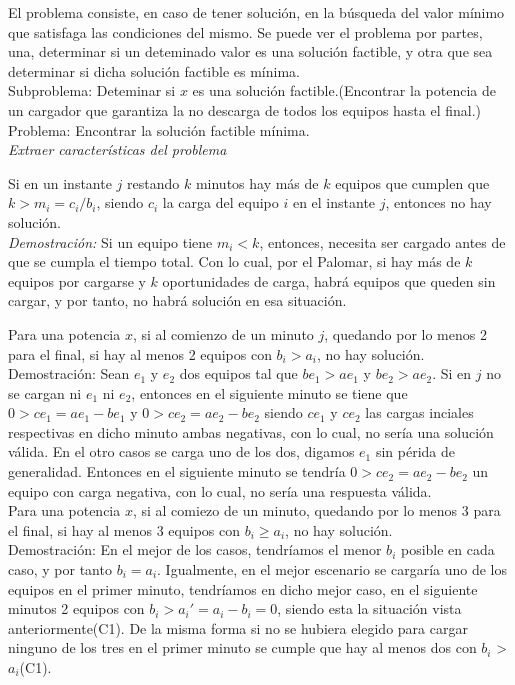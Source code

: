 \documentclass{article}
\begin{document}
El problema consiste, en caso de tener soluci\'on,  en la b\'usqueda del valor m\'inimo que satisfaga las condiciones del mismo. Se puede ver el problema por partes, una, determinar si un deteminado valor es una soluci\'on factible, y otra que sea determinar si dicha soluci\'on factible es m\'inima.\\

Subproblema: Deteminar si $x$ es una soluci\'on factible.(Encontrar la potencia de un cargador que garantiza la no descarga de todos los equipos hasta el final.)\\

Problema: Encontrar la soluci\'on factible m\'inima.\\

\textit{Extraer caracter\'isticas del problema}

 Si en un instante $j$ restando $k$ minutos hay m\'as de $k$ equipos que cumplen que $k>m_i=c_i/b_i$, siendo $c_i$ la carga del equipo $i$ en el instante $j$, entonces no hay soluci\'on.\\
\textit{Demostraci\'on:} Si un equipo tiene $m_i< k$, entonces, necesita ser cargado antes de que se cumpla el tiempo total. Con lo cual, por el Palomar, si hay m\'as de $k$ equipos por cargarse y $k$ oportunidades de carga, habr\'a equipos que queden sin cargar, y por tanto, no habr\'a soluci\'on en esa situaci\'on.

 Para una potencia $x$, si al comienzo de un minuto $j$, quedando por lo menos 2 para el final, si hay al menos 2 equipos con $b_i>a_i$, no hay soluci\'on.\\
Demostraci\'on: Sean $e_1$ y $e_2$ dos equipos tal que $be_1>ae_1$ y $be_2 > ae_2$.  Si en $j$ no se cargan ni $e_1$ ni $e_2$, entonces en el siguiente minuto se tiene que $0>ce_1=ae_1-be_1$ y $0>ce_2=ae_2-be_2$ siendo $ce_1$ y $ce_2$ las cargas inciales respectivas en dicho minuto ambas negativas, con lo cual, no ser\'ia una soluci\'on v\'alida. En el otro casos se carga uno de los dos, digamos $e_1$ sin p\'erida de generalidad. Entonces en el siguiente minuto se tendr\'ia $0>ce_2=ae_2-be_2$ un equipo con carga negativa, con lo cual, no ser\'ia una respuesta v\'alida. \\

 Para una potencia $x$, si al comiezo de un minuto, quedando por lo menos 3 para  el final, si hay al menos 3 equipos con $b_i\geq a_i$, no hay soluci\'on.\\
Demostraci\'on: En el mejor de los casos, tendr\'iamos el menor $b_i$ posible en cada caso, y por tanto $b_i=a_i$. Igualmente, en el mejor escenario se cargar\'ia uno de los equipos en el primer minuto, tendr\'iamos en dicho mejor caso, en el siguiente minutos 2 equipos con $b_i>a_i'=a_i-b_i=0$, siendo esta la situaci\'on vista anteriormente(C1). De la misma forma si no se hubiera elegido para cargar ninguno de los tres en el primer minuto se cumple que hay al menos dos con $b_i$ > $a_i$(C1).\\
\end{document}
